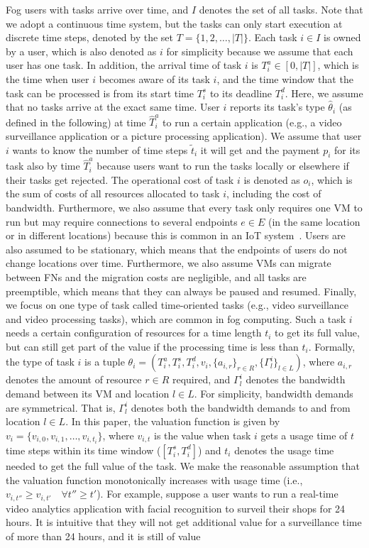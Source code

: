 \documentclass[11pt]{phdthesis}
\begin{document}
Fog users with tasks arrive over time, and $I$ denotes the set of all tasks. Note that we adopt a continuous time system, but the tasks can only start execution at discrete time steps, denoted by the set $ T = \{1,2,\ldots,|T|\} $. Each task $i \in I$ is owned by a user,  which is also denoted as $i$ for simplicity because we assume that each user has one task. In addition, the arrival time of task $i$ is $T_i^a \in [0, |T|] $, which is the time when user $i$ becomes aware of its task $ i $, and the time window that the task can be processed is from its start time $ T_i^s $ to its deadline $ T_i^d $. Here, we assume that no tasks arrive at the exact same time. User $i$ reports its task's type $ \hat{\theta}_i $ (as defined in the following) at time $\hat{T}_i^a$ to run a certain application (e.g., a video surveillance application or a picture processing application). We assume that user $i$ wants to know the number of time steps $ \tilde{t}_i $ it will get and the payment $ p_i$ for its task also by time $\hat{T}_i^a$ because users want to run the tasks locally or elsewhere if their tasks get rejected. The operational cost of task $ i $ is denoted as $ o_i $, which is the sum of costs of all resources allocated to task $ i $, including the cost of bandwidth. Furthermore, we also assume that every task only requires one VM to run but may require connections to several endpoints $ e \in E$ (in the same location or in different locations) because this is common in an IoT system~\citep{du2018computation}. Users are also assumed to be stationary, which means that the endpoints of users do not change locations over time. Furthermore, we also assume VMs can migrate between FNs and the migration costs are negligible, and all tasks are preemptible, which means that they can always be paused and resumed. Finally, we focus on one type of task called time-oriented tasks (e.g., video surveillance and video processing tasks), which are common in fog computing. Such a task $i$ needs a certain configuration of resources for a time length $t_i$ to get its full value, but can still get part of the value if the processing time is less than $t_i$. Formally, the type of task $i$ is a tuple $\theta_i = (T_i^a, T_i^s, T_i^d, v_i, \{ a_{i,r} \}_{r \in R}, \{ \Gamma_l^i \}_{l \in L} )$, where $a_{i,r}$ denotes the amount of resource $r \in R$ required, and $ \Gamma_l^i$ denotes the bandwidth demand between its VM and location $l \in L$. For simplicity, bandwidth demands are symmetrical. That is, $\Gamma_l^i$ denotes both the bandwidth demands to and from location $l \in L$. In this paper, the valuation function is given by $ v_i = \{v_{i,0}, v_{i,1},\ldots,v_{i,t_i}\} $, where $ v_{i,t} $ is the value when task $ i $ gets a usage time of $ t $ time steps within its time window ($ [T_i^s, T_i^d] $) and $t_i$ denotes the usage time needed to get the full value of the task. We make the reasonable assumption that the valuation function monotonically increases with usage time (i.e., $ v_{i,t''} \geq v_{i,t'} \quad \forall t'' \geq t' $). For example, suppose a user wants to run a real-time video analytics application with facial recognition to surveil their shops for 24 hours. It is intuitive that they will not get additional value for a surveillance time of more than 24 hours, and it is still of value 
\end{document}
